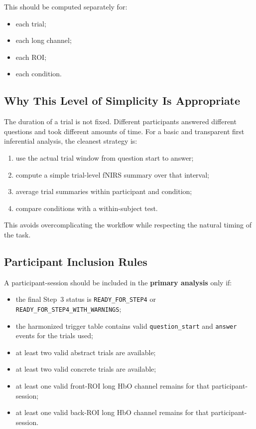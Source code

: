 \documentclass[11pt]{article}
\begin{document}
This should be computed separately for:
\begin{itemize}
    \item each trial;
    \item each long channel;
    \item each ROI;
    \item each condition.
\end{itemize}

\subsection{Why This Level of Simplicity Is Appropriate}
The duration of a trial is not fixed.
Different participants answered different questions and took different amounts of time.
For a basic and transparent first inferential analysis, the cleanest strategy is:
\begin{enumerate}
    \item use the actual trial window from question start to answer;
    \item compute a simple trial-level fNIRS summary over that interval;
    \item average trial summaries within participant and condition;
    \item compare conditions with a within-subject test.
\end{enumerate}

This avoids overcomplicating the workflow while respecting the natural timing of the task.

\subsection{Participant Inclusion Rules}
A participant-session should be included in the \textbf{primary analysis} only if:
\begin{itemize}
    \item the final Step~3 status is \texttt{READY\_FOR\_STEP4} or
    \texttt{READY\_FOR\_STEP4\_WITH\_WARNINGS};
    \item the harmonized trigger table contains valid \texttt{question\_start} and \texttt{answer}
    events for the trials used;
    \item at least two valid abstract trials are available;
    \item at least two valid concrete trials are available;
    \item at least one valid front-ROI long HbO channel remains for that participant-session;
    \item at least one valid back-ROI long HbO channel remains for that participant-session.
\end{itemize}
\end{document}
